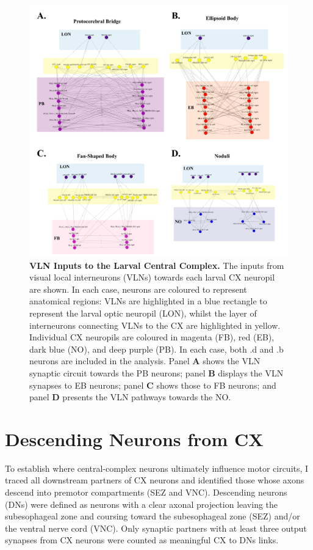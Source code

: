     \begin{figure}[H]
        \centering
        \includegraphics[width=15cm]{Figs/CX/VLNstoCX.pdf}
        \caption[Visual Inputs via VLNs to larval Central Complex Neuropils]{\textbf{VLN Inputs to the Larval Central Complex.} The inputs from visual local interneurons (VLNs) towards each larval CX neuropil are shown. In each case, neurons are coloured to represent anatomical regions: VLNs are highlighted in a blue rectangle to represent the larval optic neuropil (LON), whilst the layer of interneurons connecting VLNs to the CX are highlighted in yellow. Individual CX neuropils are coloured in magenta (FB), red (EB), dark blue (NO), and deep purple (PB). In each case, both .d and .b neurons are included in the analysis. Panel \textbf{A} shows the VLN synaptic circuit towards the PB neurons; panel \textbf{B} displays the VLN synapses to EB neurons; panel \textbf{C} shows those to FB neurons; and panel \textbf{D} presents the VLN pathways towards the NO.}
        \label{VLNs}
    \end{figure}

 \section{Descending Neurons from CX}    
 \label{CXDescendingsection}
    To establish where central-complex neurons ultimately influence motor circuits, I traced all downstream partners of CX neurons and identified those whose axons descend into premotor compartments (SEZ and VNC). Descending neurons (DNs) were defined as neurons with a clear axonal projection leaving the subesophageal zone and coursing toward the subesophageal zone (SEZ) and/or the ventral nerve cord (VNC). Only synaptic partners with at least three output synapses from CX neurons were counted as meaningful CX to DNs links. 

